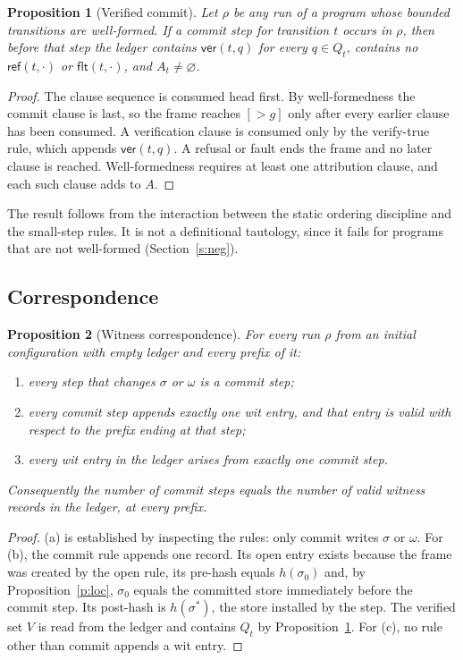 \documentclass[11pt]{article}
\newtheorem{proposition}{Proposition}
\newcommand{\hash}{h}
\begin{document}
\begin{proposition}[Verified commit]\label{p:vc}
Let $\rho$ be any run of a program whose bounded transitions are well-formed. If a commit step for transition $t$ occurs in $\rho$, then before that step the ledger contains $\mathsf{ver}(t,q)$ for every $q\in Q_t$, contains no $\mathsf{ref}(t,\cdot)$ or $\mathsf{flt}(t,\cdot)$, and $A_t\neq\varnothing$.
\end{proposition}
\begin{proof}
The clause sequence is consumed head first. By well-formedness the commit clause is last, so the frame reaches $[{>}g]$ only after every earlier clause has been consumed. A verification clause is consumed only by the verify-true rule, which appends $\mathsf{ver}(t,q)$. A refusal or fault ends the frame and no later clause is reached. Well-formedness requires at least one attribution clause, and each such clause adds to $A$.
\end{proof}

The result follows from the interaction between the static ordering discipline and the small-step rules. It is not a definitional tautology, since it fails for programs that are not well-formed (Section~\ref{s:neg}).

\subsection{Correspondence}

\begin{proposition}[Witness correspondence]\label{p:corr}
For every run $\rho$ from an initial configuration with empty ledger and every prefix of it:
\begin{enumerate}[label=(\alph*)]
\item every step that changes $\sigma$ or $\omega$ is a commit step;
\item every commit step appends exactly one \textsf{wit} entry, and that entry is valid with respect to the prefix ending at that step;
\item every \textsf{wit} entry in the ledger arises from exactly one commit step.
\end{enumerate}
Consequently the number of commit steps equals the number of valid witness records in the ledger, at every prefix.
\end{proposition}
\begin{proof}
(a) is established by inspecting the rules: only commit writes $\sigma$ or $\omega$. For (b), the commit rule appends one record. Its \textsf{open} entry exists because the frame was created by the open rule, its pre-hash equals $\hash(\sigma_0)$ and, by Proposition~\ref{p:loc}, $\sigma_0$ equals the committed store immediately before the commit step. Its post-hash is $\hash(\sigma^{\ast})$, the store installed by the step. The verified set $V$ is read from the ledger and contains $Q_t$ by Proposition~\ref{p:vc}. For (c), no rule other than commit appends a \textsf{wit} entry.
\end{proof}
\end{document}
